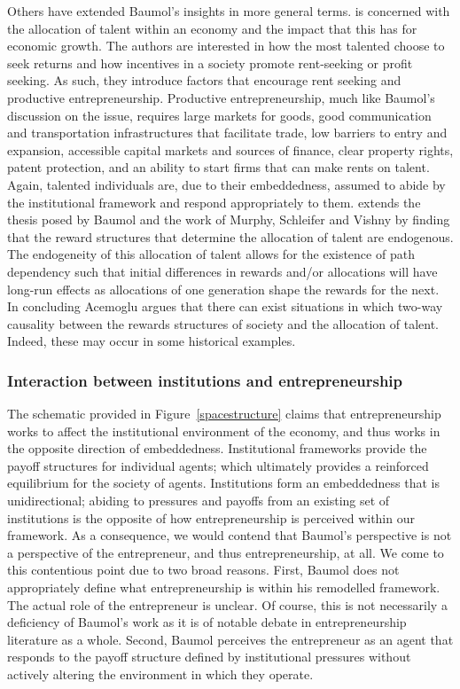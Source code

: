 Others have extended Baumol's insights in more general terms. \citet{Murphy1991} is concerned with the allocation of talent within an economy and the impact that this has for economic growth. The authors are interested in how the most talented choose to seek returns and how incentives in a society promote rent-seeking or profit seeking. As such, they introduce factors that encourage rent seeking and productive entrepreneurship. Productive entrepreneurship, much like Baumol's discussion on the issue, requires large markets for goods, good communication and transportation infrastructures that facilitate trade, low barriers to entry and expansion, accessible capital markets and sources of finance, clear property rights, patent protection, and an ability to start firms that can make rents on talent. Again, talented individuals are, due to their embeddedness, assumed to abide by the institutional framework and respond appropriately to them. \citet{Acemoglu1995} extends the thesis posed by Baumol and the work of Murphy, Schleifer and Vishny by finding that the reward structures that determine the allocation of talent are endogenous. The endogeneity of this allocation of talent allows for the existence of path dependency such that initial differences in rewards and/or allocations will have long-run effects as allocations of one generation shape the rewards for the next. In concluding Acemoglu argues that there can exist situations in which two-way causality between the rewards structures of society and the allocation of talent. Indeed, these may occur in some historical examples.

\subsubsection{Interaction between institutions and entrepreneurship}

The schematic provided in Figure~\ref{spacestructure} claims that entrepreneurship works to affect the institutional environment of the economy, and thus works in the opposite direction of embeddedness. Institutional frameworks provide the payoff structures for individual agents; which ultimately provides a reinforced equilibrium for the society of agents. Institutions form an embeddedness that is unidirectional; abiding to pressures and payoffs from an existing set of institutions is the opposite of how entrepreneurship is perceived within our framework. As a consequence, we would contend that Baumol's perspective is not a perspective of the entrepreneur, and thus entrepreneurship, at all. We come to this contentious point due to two broad reasons. First, Baumol does not appropriately define what entrepreneurship is within his remodelled framework. The actual role of the entrepreneur is unclear. Of course, this is not necessarily a deficiency of Baumol's work as it is of notable debate in entrepreneurship literature as a whole. Second, Baumol perceives the entrepreneur as an agent that responds to the payoff structure defined by institutional pressures without actively altering the environment in which they operate. 

